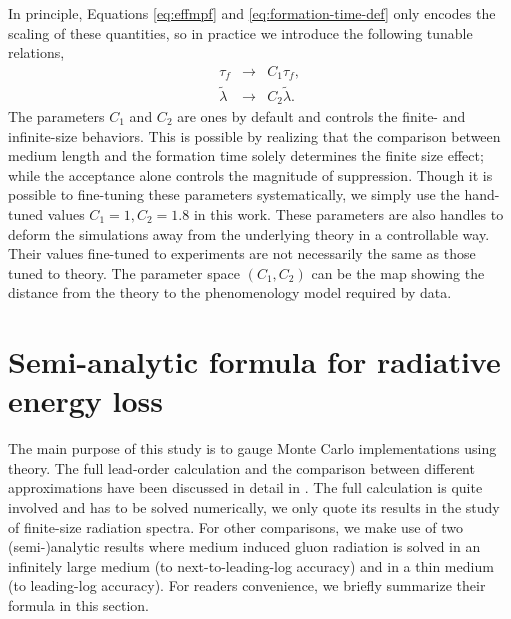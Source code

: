 \documentclass[aps, prc, reprint, amsmath, groupedaddress, nofootinbib]{revtex4-1}
\begin{document}
In principle, Equations \ref{eq:effmpf} and \ref{eq:formation-time-def} only encodes the scaling of these quantities, so in practice we introduce the following tunable relations,
\begin{eqnarray}\label{eq:tune}
\nonumber
\tau_f & \rightarrow & C_1 \tau_f, \\
\tilde{\lambda} & \rightarrow & C_2 \tilde{\lambda}.
\end{eqnarray}
The parameters $C_1$ and $C_2$ are ones by default and controls the finite- and infinite-size behaviors. 
This is possible by realizing that the comparison between medium length and the formation time solely determines the finite size effect; while the acceptance alone controls the magnitude of suppression.
Though it is possible to fine-tuning these parameters systematically, we simply use the hand-tuned values $C_1 = 1, C_2 = 1.8$ in this work.
These parameters are also handles to deform the simulations away from the underlying theory in a controllable way.
Their values fine-tuned to experiments are not necessarily the same as those tuned to theory. 
The parameter space $(C_1, C_2)$ can be the map showing the distance from the theory to the phenomenology model required by data.


\section{Semi-analytic formula for radiative energy loss}\label{section:Theo}
The main purpose of this study is to gauge Monte Carlo implementations using theory.
The full lead-order calculation and the comparison between different approximations have been discussed in detail in \cite{CaronHuot:2008uh}.
The full calculation is quite involved and has to be solved numerically, we only quote its results in the study of finite-size radiation spectra.
For other comparisons, we make use of two (semi-)analytic results where medium induced gluon radiation is solved in an infinitely large medium (to next-to-leading-log accuracy) and in a thin medium (to leading-log accuracy).
For readers convenience, we briefly summarize their formula in this section.
\end{document}
